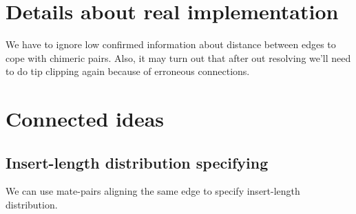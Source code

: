 \documentclass[12pt,a4paper,oneside]{article}
\begin{document}






\section{Details about real implementation}
We have to ignore low confirmed information about distance between edges to cope with chimeric pairs. Also, it may turn out that after out resolving we'll need to do tip clipping again because of erroneous connections.

\section{Connected ideas}
\subsection{Insert-length distribution specifying}
We can use mate-pairs aligning the same edge to specify insert-length distribution.
\end{document}
